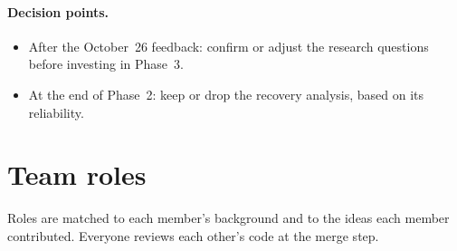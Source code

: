 \documentclass[11pt,a4paper]{article}
\begin{document}
\paragraph{Decision points.}
\begin{itemize}
  \item After the October~26 feedback: confirm or adjust the research questions before investing in Phase~3.
  \item At the end of Phase~2: keep or drop the recovery analysis, based on its reliability.
\end{itemize}

\section{Team roles}

Roles are matched to each member's background and to the ideas each member contributed. Everyone reviews each other's code at the merge step.
\end{document}
